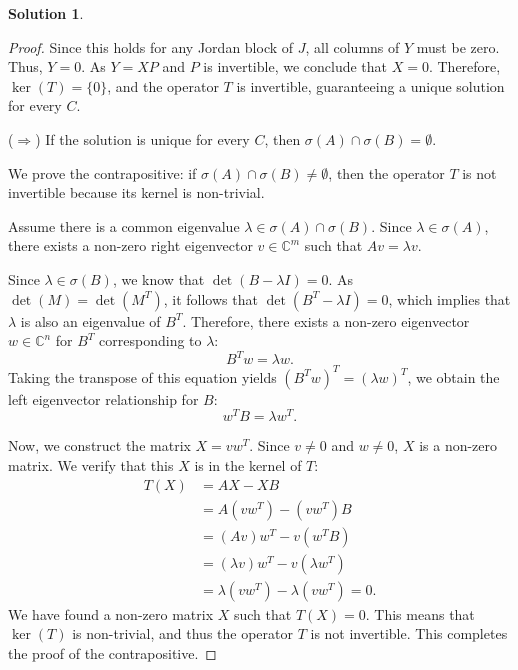 \documentclass[12pt]{article}
\theoremstyle{definition}
\newtheorem*{solution}{\normalfont\textbf{Solution}}
\begin{document}
\begin{enumerate}[leftmargin=*]
\begin{solution}
\begin{proof}
                Since this holds for any Jordan block of \( J \), all columns of \( Y \) must be zero. Thus, \( Y = 0 \). As \( Y = XP \) and \( P \) is invertible, we conclude that \( X=0 \). Therefore, \( \ker(T) = \{0\} \), and the operator \( T \) is invertible, guaranteeing a unique solution for every \( C \).

                \noindent($\Rightarrow$) If the solution is unique for every \( C \), then \( \sigma(A) \cap \sigma(B) = \emptyset \).

                We prove the contrapositive: if \( \sigma(A) \cap \sigma(B) \neq \emptyset \), then the operator \( T \) is not invertible because its kernel is non-trivial.

                Assume there is a common eigenvalue \( \lambda \in \sigma(A) \cap \sigma(B) \).
                Since \( \lambda \in \sigma(A) \), there exists a non-zero right eigenvector \( v \in \mathbb{C}^m \) such that \( Av = \lambda v \).
                    
                Since \( \lambda \in \sigma(B) \), we know that \( \det(B - \lambda I) = 0 \). As \( \det(M) = \det(M^T) \), it follows that \( \det(B^T - \lambda I) = 0 \), which implies that \( \lambda \) is also an eigenvalue of \( B^T \). Therefore, there exists a non-zero eigenvector \( w \in \mathbb{C}^n \) for \( B^T \) corresponding to \( \lambda \):
                    \[
                    B^T w = \lambda w.
                    \]
                    Taking the transpose of this equation yields \( (B^T w)^T = (\lambda w)^T \), we obtain the left eigenvector relationship for \( B \):
                    \[
                    w^T B = \lambda w^T.
                    \]

                Now, we construct the matrix \( X = vw^T \). Since \( v \neq 0 \) and \( w \neq 0 \), \( X \) is a non-zero matrix. We verify that this \( X \) is in the kernel of \( T \):
                \begin{align*}
                T(X) &= AX - XB \\
                &= A(vw^T) - (vw^T)B \\
                &= (Av)w^T - v(w^TB) \\
                &= (\lambda v)w^T - v(\lambda w^T) \\
                &= \lambda(vw^T) - \lambda(vw^T) = 0.
                \end{align*}
                We have found a non-zero matrix \( X \) such that \( T(X) = 0 \). This means that \( \ker(T) \) is non-trivial, and thus the operator \( T \) is not invertible. This completes the proof of the contrapositive.
            \end{proof}
        \end{solution}


\end{enumerate}
\end{document}

